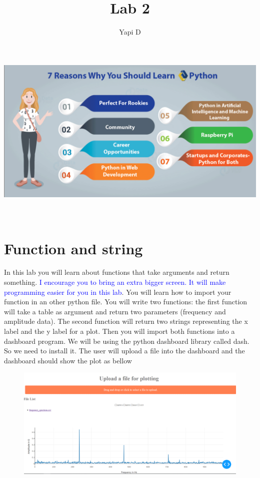 \documentclass[10pt,a4paper,titlepage]{article}
\author{Yapi D}
\title{Lab 2}
\begin{document}
	\makeatletter
\begin{titlepage}
	\begin{center}
		\includegraphics[width=1\linewidth]{pylogo}\\[4ex]
		{\huge \bfseries  \@title }\\[2ex] 
		{\LARGE  \@author}\\[50ex] 
		{\large \@date}
	\end{center}
\end{titlepage}
\makeatother
\thispagestyle{empty}
\newpage

	




\section{Function and string}
In this lab you will learn about functions that take arguments and return something. \textcolor{blue}{I encourage you to bring an extra bigger screen. It will make programming easier for you in this lab}.
\justify
You will learn how to import your function in an other python file. You will write two functions: the first function will take a table as argument and return two parameters (frequency and amplitude data).
\justify
 The second function will return two strings representing the x label and the y label for a plot. Then you will import both functions into a dashboard program. We will be using the python dashboard library called dash. So we need to install it.
The user will upload a file into the dashboard and the dashboard should show the plot as bellow 
\begin{figure}[H]
	\centering
	\includegraphics[width=1.5\linewidth]{dashboard}
\end{figure}
\justify
 
\end{document}
